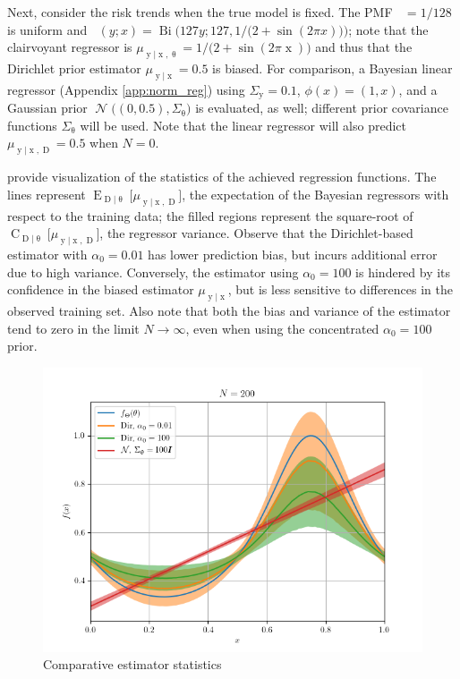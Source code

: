 \documentclass[12pt]{report}
\DeclareMathOperator{\xrm}{\mathrm{x}}
\DeclareMathOperator{\yrm}{\mathrm{y}}
\DeclareMathOperator{\Drm}{\mathrm{D}}
\DeclareMathOperator{\Erm}{\mathrm{E}}
\DeclareMathOperator{\Crm}{\mathrm{C}}
\DeclareMathOperator{\Ncal}{\mathcal{N}}
\DeclareMathOperator{\Bi}{\mathrm{Bi}}
\DeclareMathOperator{\thetam}{\theta_\text{m}}
\DeclareMathOperator{\thetac}{\theta_\text{c}}
\begin{document}
Next, consider the risk trends when the true model is fixed. The PMF $\thetam = 1/128$ is uniform and $\thetac(y;x) = \Bi\Big(127y; 127, 1 / \big(2 + \sin(2\pi x)\big)\Big)$; note that the clairvoyant regressor is $\mu_{\yrm | \xrm,\uptheta} = 1 / \big(2 + \sin(2\pi \xrm)\big)$ and thus that the Dirichlet prior estimator $\mu_{\yrm | \xrm} = 0.5$ is biased. For comparison, a Bayesian linear regressor (Appendix \ref{app:norm_reg}) using $\Sigma_{\yrm}=0.1$, $\phi(x) = (1, x)$, and a Gaussian prior $\Ncal\big((0, 0.5), \Sigma_{\uptheta}\big)$ is evaluated, as well; different prior covariance functions $\Sigma_{\uptheta}$ will be used. Note that the linear regressor will also predict $\mu_{\yrm | \xrm, \Drm} = 0.5$ when $N=0$.

 provide visualization of the statistics of the achieved regression functions. The lines represent $\Erm_{\Drm | \uptheta}\big[\mu_{\yrm | \xrm, \Drm}\big]$, the expectation of the Bayesian regressors with respect to the training data; the filled regions represent the square-root of $\Crm_{\Drm | \uptheta}\big[\mu_{\yrm | \xrm, \Drm}\big]$, the regressor variance. Observe that the Dirichlet-based estimator with $\alpha_0 = 0.01$ has lower prediction bias, but incurs additional error due to high variance. Conversely, the estimator using $\alpha_0 = 100$ is hindered by its confidence in the biased estimator $\mu_{\yrm | \xrm}$, but is less sensitive to differences in the observed training set. Also note that both the bias and variance of the estimator tend to zero in the limit $N \to \infty$, even when using the concentrated $\alpha_0 = 100$ prior.
\begin{figure}
\centering
\includegraphics[width=0.8\linewidth]{SSP_2021/Predict_SE_biased_hard.png}
\caption{Comparative estimator statistics}
\label{fig:SSP_2021/Predict_SE_biased_hard}
\end{figure}
\end{document}
